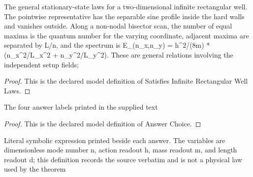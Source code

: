 \begin{definition}
  \label{def:physics:phyx-mini-0584:phyxminiproblems-problemphyxmini0584-satisfiesinfiniterectangularwelllaws}
  The general stationary-state laws for a two-dimensional infinite rectangular well. The pointwise representative has the separable sine profile inside the hard walls and vanishes outside. Along a non-nodal bisector scan, the number of equal maxima is the quantum number for the varying coordinate, adjacent maxima are separated by L/n, and the spectrum is E\_(n\_x,n\_y) = h\textasciicircum{}2/(8m) * (n\_x\textasciicircum{}2/L\_x\textasciicircum{}2 + n\_y\textasciicircum{}2/L\_y\textasciicircum{}2). These are general relations involving the independent setup fields;
\end{definition}
\begin{proof}
  This is the declared model definition of Satisfies Infinite Rectangular Well Laws.
\end{proof}
\begin{definition}
  \label{def:physics:phyx-mini-0584:phyxminiproblems-problemphyxmini0584-answerchoice}
  The four answer labels printed in the supplied text
\end{definition}
\begin{proof}
  This is the declared model definition of Answer Choice.
\end{proof}
\begin{definition}
  \label{def:physics:phyx-mini-0584:phyxminiproblems-problemphyxmini0584-displayedsymbolicenergyformula}
  Literal symbolic expression printed beside each answer. The variables are dimensionless mode number n, action readout h, mass readout m, and length readout d; this definition records the source verbatim and is not a physical law used by the theorem
\end{definition}

